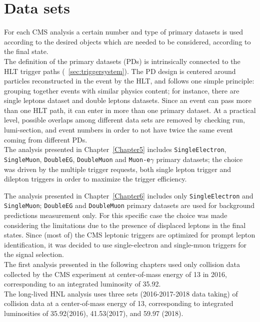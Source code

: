 \section{Data sets}\label{sec:c4data}

For each CMS analysis a certain number and type of primary datasets is used
according to the desired objects which are needed to be considered,
\ie according to the final state.\\
The definition of the primary datasets (PDs) is intrinsically connected to
the HLT trigger paths (~\ref{sec:triggersystem}). The PD design is centered
around particles reconstructed in the event by the HLT, and follows one simple principle:
grouping together events with similar physics content; for instance, there are
single leptons dataset and double leptons datasets.
Since an event can pass more than one HLT path,
it can enter in more than one primary dataset. At a practical level, possible overlaps among different data sets are
removed by checking run, lumi-section, and event numbers in order to not have twice the same event coming from different PDs.\\


The analysis presented in Chapter~\ref{Chapter5} includes
\texttt{SingleElectron}, \texttt{SingleMuon}, \texttt{DoubleEG},
\texttt{DoubleMuon} and \texttt{Muon-e$\gamma$} primary datasets; the choice was driven by the
multiple trigger requests, both single lepton trigger and
dilepton triggers in order to maximize the trigger efficiency.

The analysis presented in Chapter~\ref{Chapter6} includes only
\texttt{SingleElectron} and \texttt{SingleMuon}; \texttt{DoubleEG} and
\texttt{DoubleMuon} primary datasets are used for background
predictions measurement only. For this specific case the choice was
made considering the limitations due to the presence of displaced
leptons in the final states.
Since (most of) the CMS leptonic triggers are
optimized for prompt lepton identification, it was decided
to use single-electron and single-muon triggers for the
signal selection.\\

The first analysis presented in the following chapters used only 
\Pp collision data collected
by the CMS experiment at center-of-mass energy of 13\TeV
in 2016, corresponding to an integrated luminosity of 35.92\fbinv.\\

The long-lived HNL analysis uses three sets (2016-2017-2018 data
taking) of \Pp collision data at a
center-of-mass energy of 13\TeV, corresponding to integrated
luminosities of 35.92\fbinv (2016), 41.53\fbinv (2017), and 59.97\fbinv
(2018). 



\clearpage
